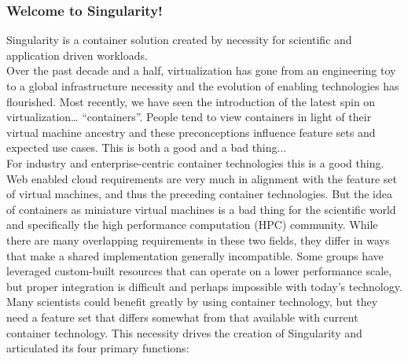 \documentclass[a4paper]{article}
\begin{document}
\subsubsection{Welcome to Singularity!}
Singularity is a container solution created by necessity for scientific and application driven workloads.
\\[0.2in]
Over the past decade and a half, virtualization has gone from an engineering toy to a global infrastructure necessity and the evolution of enabling technologies has flourished. Most recently, we have seen the introduction of the latest spin on virtualization… “containers”. People tend to view containers in light of their virtual machine ancestry and these preconceptions influence feature sets and expected use cases. This is both a good and a bad thing...
\\[0.2in]
For industry and enterprise-centric container technologies this is a good thing. Web enabled cloud requirements are very much in alignment with the feature set of virtual machines, and thus the preceding container technologies. But the idea of containers as miniature virtual machines is a bad thing for the scientific world and specifically the high performance computation (HPC) community. While there are many overlapping requirements in these two fields, they differ in ways that make a shared implementation generally incompatible. Some groups have leveraged custom-built resources that can operate on a lower performance scale, but proper integration is difficult and perhaps impossible with today’s technology.
\\[0.2in]
Many scientists could benefit greatly by using container technology, but they need a feature set that differs somewhat from that available with current container technology. This necessity drives the creation of Singularity and articulated its four primary functions:
\end{document}
